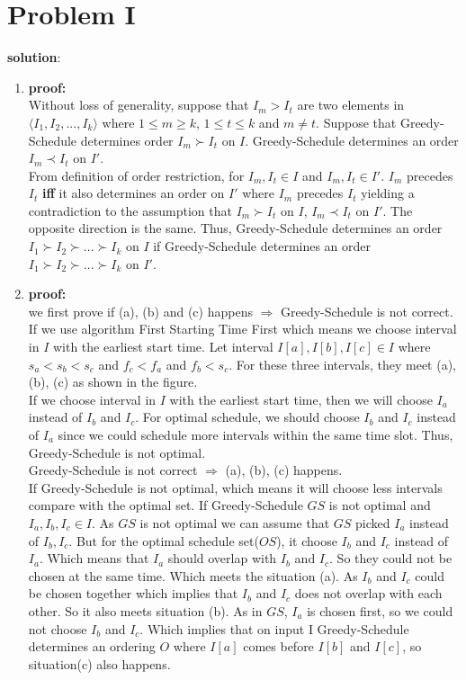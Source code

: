 \section{Problem I}
\textbf{solution}:\\
\begin{enumerate}
	\item \textbf{proof:} \\
	Without loss of generality, suppose that $I_m > I_t$ are two elements in $\langle I_1, I_2, ..., I_k \rangle$ where $1 \leq m \geq k$, $ 1 \leq t \leq k $ and $m \neq t$. Suppose that Greedy-Schedule determines order $I_m \succ I_t$ on $I$. Greedy-Schedule determines an order $I_m \prec I_t$ on $I'$.\\

	From definition of order restriction, for $I_m, I_t \in I$ and $I_m, I_t \in I'$. $I_m$ precedes $I_t$ \textbf{iff} it also determines an order on $I'$ where $I_m$ precedes $I_t$ yielding a contradiction to the assumption that $I_m \succ I_t$ on $I$, $I_m \prec I_t$ on $I'$. The opposite direction is the same. Thus, Greedy-Schedule determines an order $I_1 \succ I_2 \succ ... \succ I_k$ on $I$ if Greedy-Schedule determines an order $I_1 \succ I_2 \succ ... \succ I_k$ on $I'$. 
	\item \textbf{proof:}\\
	we first prove if (a), (b) and (c) happens $\Rightarrow$ Greedy-Schedule is not correct.\\

	If we use algorithm First Starting Time First which means we choose interval in $I$ with the earliest start time. Let interval $I[a], I[b], I[c] \in I $ where $s_a < s_b < s_c$ and $f_c < f_a$ and $f_b < s_c$. For these three intervals, they meet (a), (b), (c) as shown in the figure.\\

	If we choose interval in $I$ with the earliest start time, then we will choose $I_a$ instead of $I_b$ and $I_c$. For optimal schedule, we should choose $I_b$ and $I_c$ instead of $I_a$ since we could schedule more intervals within the same time slot. Thus, Greedy-Schedule is not optimal. \\

	Greedy-Schedule is not correct $\Rightarrow$ (a), (b), (c) happens. \\

	If Greedy-Schedule is not optimal, which means it will choose less intervals compare with the optimal set. If Greedy-Schedule $GS$ is not optimal and $I_a, I_b, I_c \in I$. As $GS$ is not optimal we can assume that $GS$ picked $I_a$ instead of $I_b, I_c$. But for the optimal schedule set($OS$), it choose $I_b$ and $I_c$ instead of $I_a$. Which means that $I_a$ should overlap with $I_b$ and $I_c$. So they could not be chosen at the same time. Which meets the situation (a). As $I_b$ and $I_c$ could be chosen together which implies that $I_b$ and $I_c$ does not overlap with each other. So it also meets situation (b). As in $GS$, $I_a$ is chosen first, so we could not choose $I_b$ and $I_c$. Which implies that on input I Greedy-Schedule determines an ordering $O$ where $I[a]$ comes before $I[b]$ and $I[c]$, so situation(c) also happens. 


\end{enumerate}
